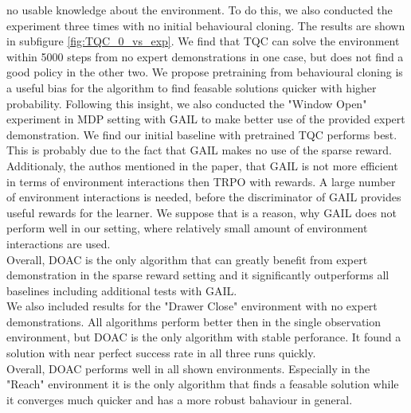 no usable knowledge about the environment. To do this, we also conducted the experiment three times with no initial behavioural cloning. The results are shown in 
subfigure \ref{fig:TQC_0_vs_exp}. We find that TQC can solve the environment within 5000 steps from no expert demonstrations in one case, but does not find a good policy in the other two. 
We propose pretraining from behavioural cloning is a useful bias for the algorithm to find feasable solutions quicker with higher probability. Following this insight, 
we also conducted the "Window Open" experiment in MDP setting with GAIL to make better use of the provided expert demonstration. We find our initial 
baseline with pretrained TQC performs best. This is probably due to the fact that GAIL makes no use of the sparse reward. Additionaly, 
the authos mentioned in the paper, that GAIL is not more efficient in terms of environment interactions then TRPO with rewards. A large number of 
environment interactions is needed, before the discriminator of GAIL provides useful rewards for the learner. We suppose that is a reason, why GAIL does not perform 
well in our setting, where relatively small amount of environment interactions are used. \\

Overall, DOAC is the only algorithm that can greatly benefit from expert demonstration in the sparse reward setting and 
it significantly outperforms all baselines including additional tests with GAIL. \\

We also included results for the "Drawer Close" environment with no expert demonstrations. All algorithms perform better then in the single observation environment, 
but DOAC is the only algorithm with stable perforance. It found a solution with near perfect success rate in all three runs quickly. \\
Overall, DOAC performs well in all shown environments. Especially in the "Reach" environment it is the only algorithm that finds a feasable solution while it 
converges much quicker and has a more robust bahaviour in general. 

